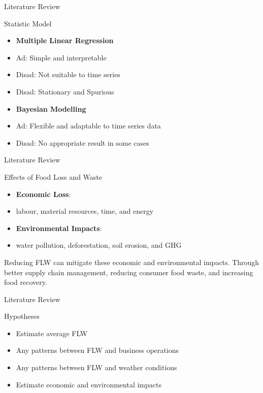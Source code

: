 \documentclass[
  ignorenonframetext,
]{beamer}
\providecommand{\tightlist}{%
  \setlength{\itemsep}{0pt}\setlength{\parskip}{0pt}}
\begin{document}
\begin{frame}{Literature Review}
\protect\hypertarget{literature-review-6}{}
\begin{block}{Statistic Model}
\protect\hypertarget{statistic-model}{}
\begin{itemize}
\item
  \textbf{Multiple Linear Regression}
\item
  Ad: Simple and interpretable
\item
  Disad: Not suitable to time series
\item
  Disad: Stationary and Spurious
\item
  \textbf{Bayesian Modelling}
\item
  Ad: Flexible and adaptable to time series data
\item
  Disad: No appropriate result in some cases
\end{itemize}
\end{block}
\end{frame}

\begin{frame}{Literature Review}
\protect\hypertarget{literature-review-7}{}
\begin{block}{Effects of Food Loss and Waste}
\protect\hypertarget{effects-of-food-loss-and-waste}{}
\begin{itemize}
\item
  \textbf{Economic Loss}:
\item
  labour, material resources, time, and energy
\item
  \textbf{Environmental Impacts}:
\item
  water pollution, deforestation, soil erosion, and GHG
\end{itemize}

Reducing FLW can mitigate these economic and environmental impacts.
Through better supply chain management, reducing consumer food waste,
and increasing food recovery.
\end{block}
\end{frame}

\begin{frame}{Literature Review}
\protect\hypertarget{literature-review-8}{}
\begin{block}{Hypotheses}
\protect\hypertarget{hypotheses}{}
\begin{itemize}
\tightlist
\item
  Estimate average FLW
\item
  Any patterns between FLW and business operations
\item
  Any patterns between FLW and weather conditions
\item
  Estimate economic and environmental impacts
\end{itemize}
\end{block}
\end{frame}
\end{document}
